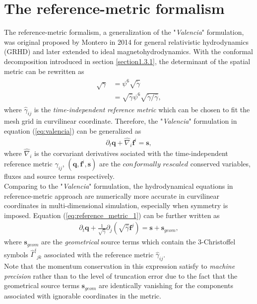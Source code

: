 \section{The reference-metric formalism} %
\label{section2.2}
The reference-metric formalism, a generalization of the "\textit{Valencia}" formulation, was original proposed by Montero \cite{montero2014general} in 2014 for general relativistic hydrodynamics (GRHD)
and later extended to ideal magnetohydrodynamics.
With the conformal decomposition introduced in section \ref{section1.3.1},
the determinant of the spatial metric can be rewritten as
\begin{align}\label{eq:reference_metric_1}
    \begin{split}
    \sqrt{\gamma} &= \psi^6 \sqrt{\tilde{\gamma}} \\
    &= \sqrt{\hat{\gamma}} \psi^6 \sqrt{\tilde{\gamma}/\hat{\gamma}},
    \end{split}
\end{align}
where $\hat{\gamma}_{ij}$ is the \textit{time-independent reference metric}
which can be chosen to fit the mesh grid in curvilinear coordinate.
Therefore, the "\textit{Valencia}" formulation in equation (\ref{eq:valencia}) can be generalized as
\begin{align}
    \partial_t \mathbf{q} + \hat{\nabla}_i \mathbf{f}^i = \mathbf{s},
\end{align}
where $\hat{\nabla}_i$ is the corvariant derivatives sociated with the time-independent reference metric $\hat{\gamma}_{ij}$,
$\left(\mathbf{q},\mathbf{f}^i,\mathbf{s}\right)$ are the $\textit{conformally rescaled}$ conserved variables,
fluxes and source terms respectively.\\
Comparing to the "\textit{Valencia}" formulation,
the hydrodynamical equations in reference-metric approach are numerically more accurate in curvilinear coordinates in multi-dimensional simulation,
especially when symmetry is imposed.
Equation (\ref{eq:reference_metric_1}) can be further written as
\begin{align}
    \partial_t \mathbf{q} + \frac{1}{\sqrt{\hat{\gamma}}}\partial_j \left(\sqrt{\hat{\gamma}} \mathbf{f}^j \right) = \mathbf{s} + \mathbf{s}_{geom},
\end{align}
where $\mathbf{s}_{geom}$ are the \textit{geometrical} source terms 
which contain the 3-Christoffel symbols $\hat{\Gamma}^i{}_{jk}$ associated with the reference metric $\hat{\gamma}_{ij}$. \\
Note that the momentum conservation in this expression satisfy to \textit{machine precision} rather than to the level of truncation error 
due to the fact that the geometrical source terms $\mathbf{s}_{geom}$ are identically vanishing 
for the components associated with ignorable coordinates in the metric.

